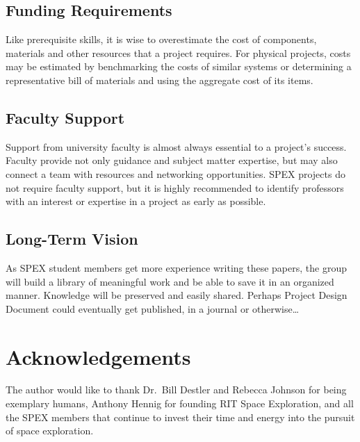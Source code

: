 \documentclass[conference]{IEEEtran} %
\begin{document}
\subsection{Funding Requirements}
Like prerequisite skills, it is wise to overestimate the cost of components, materials and other resources that a project requires.
For physical projects, costs may be estimated by benchmarking the costs of similar systems or determining a representative bill of materials and using the aggregate cost of its items.

\subsection{Faculty Support}
Support from university faculty is almost always essential to a project's success.
Faculty provide not only guidance and subject matter expertise, but may also connect a team with resources and networking opportunities.
SPEX projects do not require faculty support, but it is highly recommended to identify professors with an interest or expertise in a project as early as possible.

\subsection{Long-Term Vision}
\label{sec:vision}
As SPEX student members get more experience writing these papers, the group will build a library of meaningful work and be able to save it in an organized manner.
Knowledge will be preserved and easily shared.
Perhaps Project Design Document could eventually get published, in a journal or otherwise\ldots

\section*{Acknowledgements}
The author would like to thank Dr.~Bill Destler and Rebecca Johnson for being exemplary humans, Anthony Hennig for founding RIT Space Exploration, and all the SPEX members that continue to invest their time and energy into the pursuit of space exploration.

%
%

\end{document}
